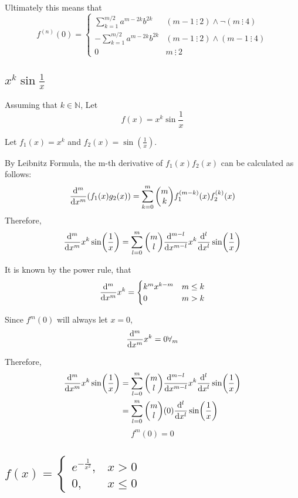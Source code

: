 \documentclass[]{article}
\newcommand{\N}{\mathbb{N}}
\newcommand{\divisible}{ \ \vdots \ }
\begin{document}
Ultimately this means that 
\[
    f^{(n)}(0) = \begin{cases}
        \sum_{k = 1}^{m/2} a^{m - 2 k} b^{2 k}
        &(m  - 1 \divisible 2) \land \lnot (m \divisible 4)\\
        - \sum_{k = 1}^{m/2} a^{m - 2 k} b^{2 k}
        &(m - 1 \divisible 2) \land (m - 1 \divisible 4)\\
        0
        & m \divisible 2
    \end{cases}
\]
    
\subsection{
    $x^k \sin{\frac{1}{x}}$
}
Assuming that $k \in \N$, Let
\[
    f(x) = x^k \sin{\frac{1}{x}}
\]

Let $f_1(x) = x^k$ and $f_2(x) = \sin(\frac{1}{x})$.

By Leibnitz Formula, the m-th derivative of $f_1(x) f_2(x)$ can be calculated as follows:
\[
    \dv[m]{x}\qty(f_1(x) g_2(x)) 
    = \sum_{k=0}^m \mqty(m \\ k) f_1^{(m-k)}(x) f_2^{(k)}(x)
\]
Therefore,
\[
    \dv[m]{x} x^k \sin(\frac{1}{x})
        = \sum_{l = 0}^m \mqty(m \\ l)
            \dv[m - l]{x} x^k
            \dv[l]{x} \sin(\frac{1}{x})
\]

It is known by the power rule, that
\[
    \dv[m]{x} x^k = \begin{cases}
        k^{m} x^{k - m} &m \leq k\\
        0 &m > k
    \end{cases}
\]

Since $f^{m}(0)$ will always let $x = 0$, 
\[
    \dv[m]{x} x^k = 0 \forall_{m}
\]

Therefore,
\begin{align*}
    \dv[m]{x} x^k \sin(\frac{1}{x})
        &= \sum_{l = 0}^m \mqty(m \\ l)
            \dv[m - l]{x} x^k
            \dv[l]{x} \sin(\frac{1}{x})\\
        &= \sum_{l = 0}^m \mqty(m \\ l)
            (0)
            \dv[l]{x} \sin(\frac{1}{x})
\end{align*}
\[
    \boxed{f^{m}(0) = 0}
\]

\newpage
\subsection{
    $f(x) =
    \begin{cases}
        e^{-\frac{1}{x^2}}, &x > 0\\
        0,                  &x \leq 0
    \end{cases}$
}
\end{document}
